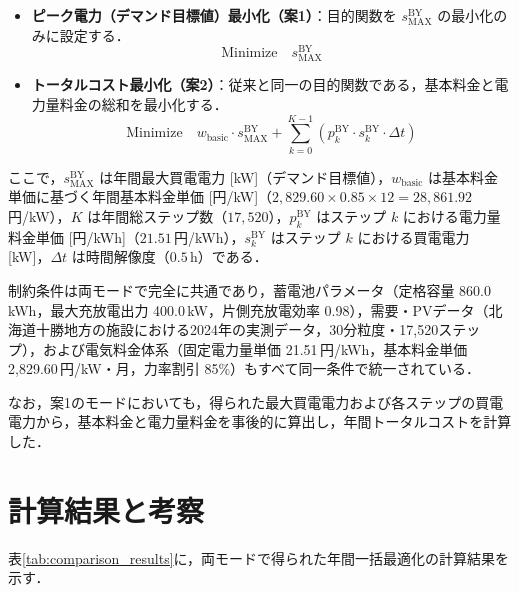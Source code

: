 \documentclass[a4paper,11pt,dvipdfmx]{jsarticle}
\begin{document}
\begin{itemize}
    \item \textbf{ピーク電力（デマンド目標値）最小化（案1）}：目的関数を $s^{\mathrm{BY}}_{\mathrm{MAX}}$ の最小化のみに設定する．
          \begin{equation}
              \text{Minimize} \quad s^{\mathrm{BY}}_{\mathrm{MAX}}
          \end{equation}
    \item \textbf{トータルコスト最小化（案2）}：従来と同一の目的関数である，基本料金と電力量料金の総和を最小化する．
          \begin{equation}
              \text{Minimize} \quad w_{\mathrm{basic}} \cdot s^{\mathrm{BY}}_{\mathrm{MAX}} + \sum_{k=0}^{K-1} \left( p^{\mathrm{BY}}_{k} \cdot s^{\mathrm{BY}}_{k} \cdot \Delta t \right)
          \end{equation}
\end{itemize}
ここで，$s^{\mathrm{BY}}_{\mathrm{MAX}}$ は年間最大買電電力 [kW]（デマンド目標値），$w_{\mathrm{basic}}$ は基本料金単価に基づく年間基本料金単価 [円/kW]（$2,829.60 \times 0.85 \times 12 = 28,861.92$\,円/kW），$K$ は年間総ステップ数（$17,520$），$p^{\mathrm{BY}}_{k}$ はステップ $k$ における電力量料金単価 [円/kWh]（$21.51$\,円/kWh），$s^{\mathrm{BY}}_{k}$ はステップ $k$ における買電電力 [kW]，$\Delta t$ は時間解像度（$0.5$\,h）である．


制約条件は両モードで完全に共通であり，蓄電池パラメータ（定格容量 860.0\,kWh，最大充放電出力 400.0\,kW，片側充放電効率 0.98），需要・PVデータ（北海道十勝地方の施設における2024年の実測データ，30分粒度・17,520ステップ），および電気料金体系（固定電力量単価 21.51\,円/kWh，基本料金単価 2,829.60\,円/kW・月，力率割引 85\%）もすべて同一条件で統一されている．

なお，案1のモードにおいても，得られた最大買電電力および各ステップの買電電力から，基本料金と電力量料金を事後的に算出し，年間トータルコストを計算した．

\section{計算結果と考察}
表\ref{tab:comparison_results}に，両モードで得られた年間一括最適化の計算結果を示す．
\end{document}
